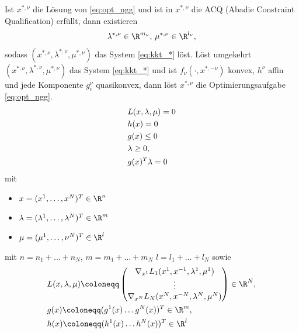 Ist $x^{*, \nu}$ die Lösung von \eqref{eq:opt_ngg} und ist in $x^{*, \nu}$ die ACQ (Abadie Constraint Qualification) erfüllt, dann existieren
\begin{align*}
  \lambda^{*, \nu} \in \R^{m_{\nu}}, \, \mu^{*, \nu} \in \R^{l_{\nu}}, 
\end{align*}
sodass $(x^{*, \nu}, \lambda^{*, \nu}, \mu^{*, \nu})$ das System \eqref{eq:kkt_*} löst. Löst umgekehrt $(x^{*, \nu}, \lambda^{*, \nu}, \mu^{*, \nu})$ das System \eqref{eq:kkt_*} und ist $f_{\nu}(\cdot, x^{*, -\nu})$ konvex, $h^{\nu}$ affin und jede Komponente $g_{i}^{\nu}$ quasikonvex, dann löst $x^{*, \nu}$ die Optimierungsaufgabe \eqref{eq:opt_ngg}. 
\begin{align}\label{eq:kkt}
&  L(x, \lambda, \mu)= 0\\
&h(x) = 0\notag\\
&g(x) \leq 0\notag\\
&\lambda \geq 0,\notag\\
&g(x)^{T} \lambda = 0 \notag
\end{align}
mit
\begin{itemize}
\item $x = (x^{1}, \dots, x^{N})^{T} \in \R^{n}$
\item $\lambda = (\lambda^{1}, \dots, \lambda^{N})^{T} \in \R^{m}$
\item $\mu = (\mu^{1}, \dots, \nu^{N})^{T} \in \R^{l}$
\end{itemize}
mit $n = n_{1} + \dots + n_{N}$, $m = m_{1} + \dots + m_{N}$ $l = l_{1} + \dots + l_{N}$ sowie
\begin{align}\label{eq:3-12}
&  L(x, \lambda, \mu) \coloneqq
  \begin{pmatrix}
      \nabla_{x^1}L_{1}(x^{1}, x^{-1}, \lambda^{1}, \mu^{1})\\
\vdots\\
\nabla_{x^N}L_{N}(x^{N}, x^{-N}, \lambda^{N}, \mu^{N})
  \end{pmatrix} \in \R^{N}, \\
&g(x) \coloneqq (g^{1}(x)  \dots g^{N}(x))^{T} \in \R^{m}, \\
&h(x) \coloneqq (h^{1}(x)  \dots h^{N}(x))^{T} \in \R^{l}
\end{align}

